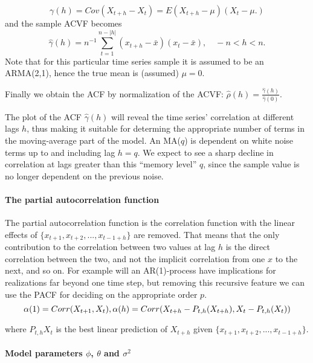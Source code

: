 \documentclass[]{article}
\let\oldparagraph\paragraph
\renewcommand{\paragraph}[1]{\oldparagraph{#1}\mbox{}}
\begin{document}
\[
\gamma(h) = Cov(X_{t+h}-X_{t}) = E(X_{t+h}-\mu)(X_{t}-\mu.)
\] and the sample ACVF becomes \[
\hat{\gamma}(h)=n^{-1}\sum_{t=1}^{n-|h|}(x_{t+h}-\bar{x})(x_{t}-\bar{x}), \quad -n<h<n.
\] Note that for this particular time series sample it is assumed to be
an ARMA(2,1), hence the true mean is (assumed) \(\mu=0\).

Finally we obtain the ACF by normalization of the ACVF:
\(\hat{\rho}(h) = \frac{\hat{\gamma}(h)}{\hat{\gamma}(0)}\).

The plot of the ACF \(\hat{\gamma}(h)\) will reveal the time series'
correlation at different lags \(h\), thus making it suitable for
determing the appropriate number of terms in the moving-average part of
the model. An MA(\(q\)) is dependent on white noise terms up to and
including lag \(h=q\). We expect to see a sharp decline in correlation
at lags greater than this ``memory level'' \(q\), since the sample value
is no longer dependent on the previous noise.

\paragraph{The partial autocorrelation
function}\label{the-partial-autocorrelation-function}

The partial autocorrelation function is the correlation function with
the linear effects of \(\{x_{t+1},x_{t+2},...,x_{t-1+h}\}\) are removed.
That means that the only contribution to the correlation between two
values at lag \(h\) is the direct correlation between the two, and not
the implicit correlation from one \(x\) to the next, and so on. For
example will an AR(1)-process have implications for realizations far
beyond one time step, but removing this recursive feature we can use the
PACF for deciding on the appropriate order \(p\). \[
\alpha(1)=Corr(X_{t+1},X_t), \\
\alpha(h) = Corr(X_{t+h}-P_{t,h}(X_{t+h}),X_{t}-P_{t,h}(X_{t}))
\]

where \(P_{t,h}X_t\) is the best linear prediction of \(X_{t+h}\) given
\(\{x_{t+1},x_{t+2},...,x_{t-1+h}\}\).

\paragraph{\texorpdfstring{Model parameters \(\phi\), \(\theta\) and
\(\sigma^2\)}{Model parameters \textbackslash{}phi, \textbackslash{}theta and \textbackslash{}sigma\^{}2}}\label{model-parameters-phi-theta-and-sigma2}
\end{document}
